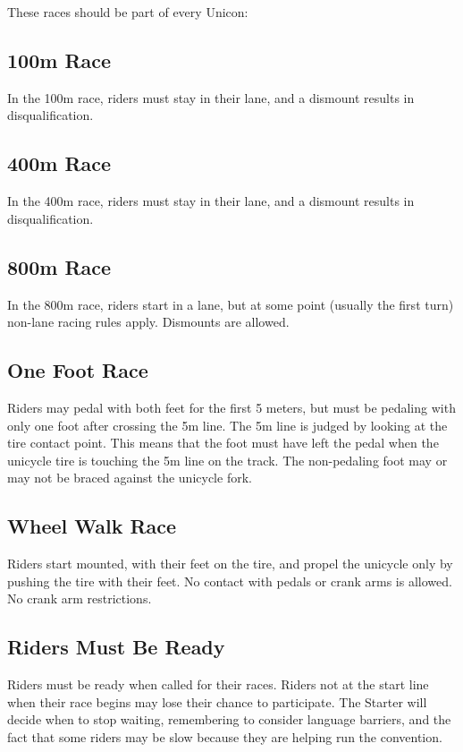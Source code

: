 These races should be part of every Unicon:

\subsection{100m Race}

In the 100m race, riders must stay in their lane, and a dismount results in disqualification.

\subsection{400m Race}

In the 400m race, riders must stay in their lane, and a dismount results in disqualification.

\subsection{800m Race}

In the 800m race, riders start in a lane, but at some point (usually the first turn) non-lane racing rules apply.
Dismounts are allowed.

\subsection{One Foot Race}
Riders may pedal with both feet for the first 5 meters, but must be pedaling with only one foot after crossing the 5m line.
The 5m line is judged by looking at the tire contact point.
This means that the foot must have left the pedal when the unicycle tire is touching the 5m line on the track.
The non-pedaling foot may or may not be braced against the unicycle fork.

\subsection{Wheel Walk Race}

Riders start mounted, with their feet on the tire, and propel the unicycle only by pushing the tire with their feet.
No contact with pedals or crank arms is allowed.
No crank arm restrictions.

\subsection{Riders Must Be Ready}

Riders must be ready when called for their races.
Riders not at the start line when their race begins may lose their chance to participate.
The Starter will decide when to stop waiting, remembering to consider language barriers, and the fact that some riders may be slow because they are helping run the convention.

